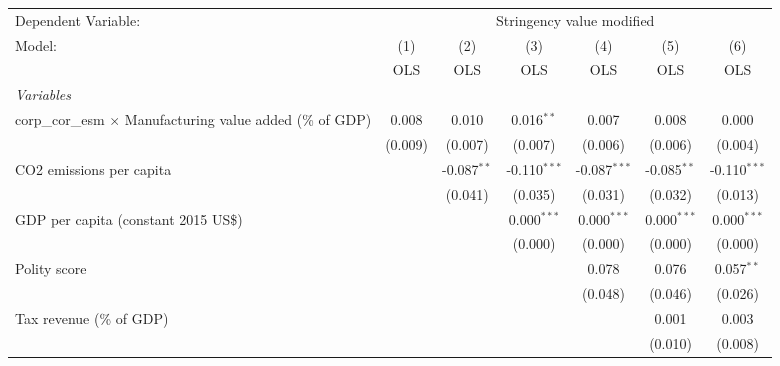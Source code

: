 
\begingroup
\centering
\begin{tabular}{lcccccc}
   \toprule
   Dependent Variable: & \multicolumn{6}{c}{Stringency value modified}\\
   Model:                                                            & (1)     & (2)           & (3)            & (4)            & (5)           & (6)\\  
                                                                     &  OLS    & OLS           & OLS            & OLS            & OLS           & OLS\\  
   \midrule
   \emph{Variables}\\
   corp\_cor\_esm $\times$ Manufacturing value added (\% of GDP)     & 0.008   & 0.010         & 0.016$^{**}$   & 0.007          & 0.008         & 0.000\\   
                                                                     & (0.009) & (0.007)       & (0.007)        & (0.006)        & (0.006)       & (0.004)\\   
   CO2 emissions per capita                                          &         & -0.087$^{**}$ & -0.110$^{***}$ & -0.087$^{***}$ & -0.085$^{**}$ & -0.110$^{***}$\\   
                                                                     &         & (0.041)       & (0.035)        & (0.031)        & (0.032)       & (0.013)\\   
   GDP per capita (constant 2015 US\$)                               &         &               & 0.000$^{***}$  & 0.000$^{***}$  & 0.000$^{***}$ & 0.000$^{***}$\\   
                                                                     &         &               & (0.000)        & (0.000)        & (0.000)       & (0.000)\\   
   Polity score                                                      &         &               &                & 0.078          & 0.076         & 0.057$^{**}$\\   
                                                                     &         &               &                & (0.048)        & (0.046)       & (0.026)\\   
   Tax revenue (\% of GDP)                                           &         &               &                &                & 0.001         & 0.003\\   
                                                                     &         &               &                &                & (0.010)       & (0.008)\\   

\end{tabular}
